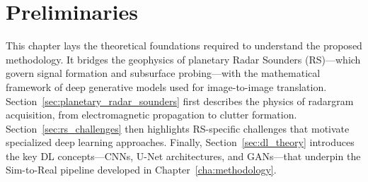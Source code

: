 \chapter{Preliminaries}
\label{cha:preliminaries}
This chapter lays the theoretical foundations required to understand the proposed methodology.
It bridges the geophysics of planetary Radar Sounders (RS)---which govern signal formation and subsurface probing---with the mathematical framework of deep generative models used for image-to-image translation.
Section~\ref{sec:planetary_radar_sounders} first describes the physics of radargram acquisition, from electromagnetic propagation to clutter formation.
Section~\ref{sec:rs_challenges} then highlights RS-specific challenges that motivate specialized deep learning approaches.
Finally, Section~\ref{sec:dl_theory} introduces the key DL concepts---CNNs, U-Net architectures, and GANs---that underpin the Sim-to-Real pipeline developed in Chapter~\ref{cha:methodology}.





